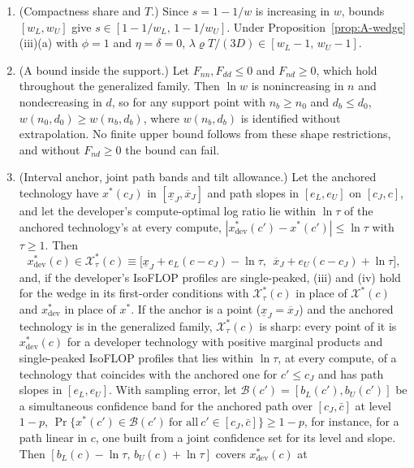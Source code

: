 \begin{proposition}
\begin{enumerate}
$x$; in the generalized family $\theta_L=\theta_U=1/\sigma^*-1$, so a range for $\sigma^*$ gives $[\theta_L,\theta_U]$.
With $\mathcal X^*(c)=[\ell,u]$: $\ln w\in[\theta_L(x-u),\,\theta_U(x-\ell)]$ if $x>u$;
$\ln w\in[\theta_U(x-u),\,\theta_L(x-\ell)]$ if $x<\ell$; and $\ln w\in[\theta_U(x-u),\,\theta_U(x-\ell)]$ if
$\ell\le x\le u$.
\item[(v)] (Compactness share and $T$.) Since $s=1-1/w$ is increasing in $w$, bounds $[w_L,w_U]$ give
$s\in[1-1/w_L,\,1-1/w_U]$. Under Proposition~\ref{prop:A-wedge}(iii)(a) with $\phi=1$ and $\eta=\delta=0$,
$\lambda\varrho T/(3D)\in[w_L-1,\,w_U-1]$.
\item[(vi)] (A bound inside the support.) Let $F_{nn},F_{dd}\le0$ and $F_{nd}\ge0$, which hold throughout the generalized
family. Then $\ln w$ is nonincreasing in $n$ and nondecreasing in $d$, so for any support point with $n_b\ge n_0$ and
$d_b\le d_0$, $w(n_0,d_0)\ge w(n_b,d_b)$, where $w(n_b,d_b)$ is identified without extrapolation. No finite upper bound
follows from these shape restrictions, and without $F_{nd}\ge0$ the bound can fail.
\item[(vii)] (Interval anchor, joint path bands and tilt allowance.) Let the anchored technology have $x^*(c_J)$ in
$[\underline x_J,\overline x_J]$ and path slopes in $[e_L,e_U]$ on $[c_J,c]$, and let the developer's compute-optimal log
ratio lie within $\ln\tau$ of the anchored technology's at every compute, $|x^*_{\mathrm{dev}}(c')-x^*(c')|\le\ln\tau$
with $\tau\ge1$. Then
\[
x^*_{\mathrm{dev}}(c)\in\mathcal X^*_\tau(c)\equiv\big[\underline x_J+e_L(c-c_J)-\ln\tau,\ \
\overline x_J+e_U(c-c_J)+\ln\tau\big],
\]
and, if the developer's IsoFLOP profiles are single-peaked, (iii) and (iv) hold for the wedge in its first-order
conditions with $\mathcal X^*_\tau(c)$ in place of $\mathcal X^*(c)$ and $x^*_{\mathrm{dev}}$ in place of $x^*$. If the
anchor is a point ($\underline x_J=\overline x_J$) and the anchored technology is in the generalized family,
$\mathcal X^*_\tau(c)$ is sharp: every point of it is $x^*_{\mathrm{dev}}(c)$ for a developer technology with positive
marginal products and single-peaked IsoFLOP profiles that lies within $\ln\tau$, at every compute, of a technology that
coincides with the anchored one for $c'\le c_J$ and has path slopes in $[e_L,e_U]$. With sampling error, let
$\mathcal B(c')=[b_L(c'),b_U(c')]$ be a simultaneous confidence band for the anchored path over $[c_J,\bar c]$ at level
$1-p$, $\Pr\{x^*(c')\in\mathcal B(c')\ \text{for all}\ c'\in[c_J,\bar c]\}\ge1-p$, for instance, for a path linear in
$c$, one built from a joint confidence set for its level and slope. Then $[b_L(c)-\ln\tau,\,b_U(c)+\ln\tau]$ covers $x^*_{\mathrm{dev}}(c)$ at

\end{enumerate}
\end{proposition}
